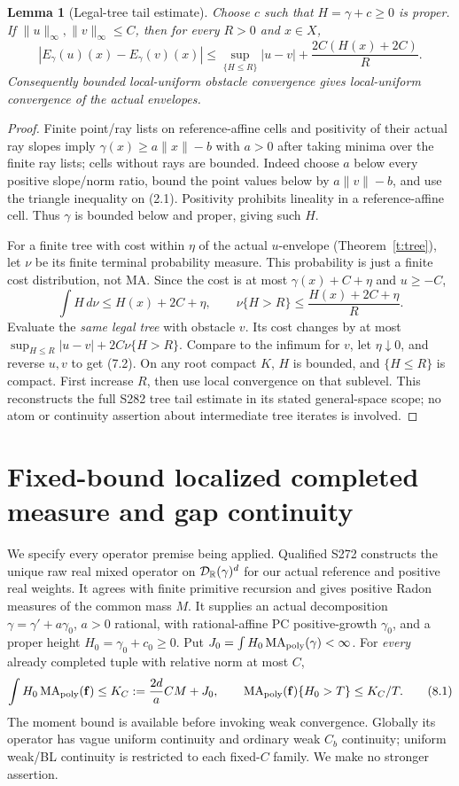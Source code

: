 \documentclass[11pt]{article}
\newtheorem{lemma}[theorem]{Lemma}
\newcommand{\MA}{\operatorname{MA}_{\rm poly}}\newcommand{\rec}{\operatorname{rec}}
\begin{document}
\begin{lemma}[Legal-tree tail estimate]\label{l:tails}
Choose $c$ such that $H=\gamma+c\geq0$ is proper. If $\|u\|_\infty,\|v\|_\infty\leq C$, then for every $R>0$ and $x\in X$,
\[
 |E_\gamma(u)(x)-E_\gamma(v)(x)|
 \leq \sup_{\{H\leq R\}}|u-v|+
                         \frac{2C(H(x)+2C)}{R}.                     \tag{7.2}
\]
Consequently bounded local-uniform obstacle convergence gives local-uniform convergence of the actual envelopes.
\end{lemma}
\begin{proof}
Finite point/ray lists on reference-affine cells and positivity of their actual ray slopes imply $\gamma(x)\geq a\|x\|-b$ with $a>0$ after taking minima over the finite ray lists; cells without rays are bounded. Indeed choose $a$ below every positive slope/norm ratio, bound the point values below by $a\|v\|-b$, and use the triangle inequality on (2.1). Positivity prohibits lineality in a reference-affine cell. Thus $\gamma$ is bounded below and proper, giving such $H$.

For a finite tree with cost within $\eta$ of the actual $u$-envelope (Theorem~\ref{t:tree}), let $\nu$ be its finite terminal probability measure. This probability is just a finite cost distribution, not MA. Since the cost is at most $\gamma(x)+C+\eta$ and $u\geq-C$,
\[
 \int H\,d\nu\leq H(x)+2C+\eta,\qquad
 \nu\{H>R\}\leq\frac{H(x)+2C+\eta}{R}.                            \tag{7.3}
\]
Evaluate the \emph{same legal tree} with obstacle $v$. Its cost changes by at most $\sup_{H\leq R}|u-v|+2C\nu\{H>R\}$. Compare to the infimum for $v$, let $\eta\downarrow0$, and reverse $u,v$ to get (7.2). On any root compact $K$, $H$ is bounded, and $\{H\leq R\}$ is compact. First increase $R$, then use local convergence on that sublevel. This reconstructs the full S282 tree tail estimate in its stated general-space scope; no atom or continuity assertion about intermediate tree iterates is involved.
\end{proof}

\section{Fixed-bound localized completed measure and gap continuity}
We specify every operator premise being applied. Qualified S272 constructs the unique raw real mixed operator on $\mathcal D_\mathbb R(\gamma)^d$ for our actual reference and positive real weights. It agrees with finite primitive recursion and gives positive Radon measures of the common mass $M$. It supplies an actual decomposition $\gamma=\gamma'+a\gamma_0$, $a>0$ rational, with rational-affine PC positive-growth $\gamma_0$, and a proper height $H_0=\gamma_0+c_0\geq0$. Put $J_0=\int H_0\MA(\gamma)<\infty$. For \emph{every} already completed tuple with relative norm at most $C$,
\[
 \int H_0\MA(\mathbf f)\leq K_C:=\frac{2d}{a}CM+J_0,
 \qquad\MA(\mathbf f)\{H_0>T\}\leq K_C/T.                          \tag{8.1}
\]
The moment bound is available before invoking weak convergence. Globally its operator has vague uniform continuity and ordinary weak $C_b$ continuity; uniform weak/BL continuity is restricted to each fixed-$C$ family. We make no stronger assertion.
\end{document}
